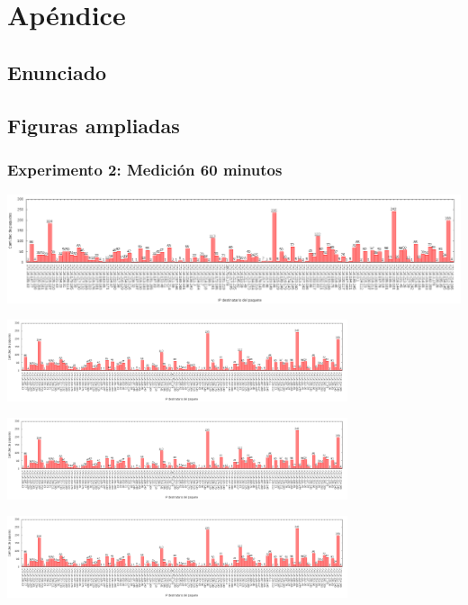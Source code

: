 \section{Apéndice}

\subsection{Enunciado}


\newpage
\subsection{Figuras ampliadas}
\subsubsection{Experimento 2: Medición 60 minutos} \label{exp2_60_big}
\begin{center}
  \includegraphics[angle=90, height=0.9\textheight]{../mediciones/altop-wifi-60/altop60IpsDstArp.png}
\end{center}

\includegraphics[width=10cm,trim={0 0 35.95cm 0},clip]{../mediciones/altop-wifi-60/altop60IpsDstArp.png}

\includegraphics[width=10cm,trim={17cm 0 20.7cm 0},clip]{../mediciones/altop-wifi-60/altop60IpsDstArp.png}

\includegraphics[width=10cm,trim={32.26cm 0 0 0},clip]{../mediciones/altop-wifi-60/altop60IpsDstArp.png}
